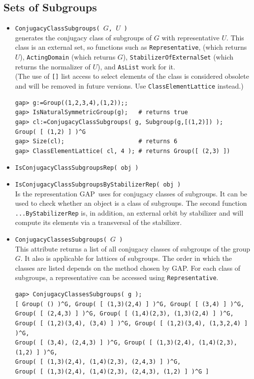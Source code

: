 \documentclass[11pt]{amsart}
\newcommand{\gap}{GAP}   %
\theoremstyle{plain}
\newcommand{\codesize}{\footnotesize}
\newcommand{\<}{\ensuremath{\langle}}
\renewcommand{\>}{\ensuremath{\rangle}}
\begin{document}
\subsection{Sets of Subgroups}
\begin{itemize}
\item {\tt ConjugacyClassSubgroups( $G$, $U$ )}\\
generates the conjugacy class of subgroups of $G$ with representative $U$. This class
is an external set, so functions such as {\tt Representative}, (which returns $U$),
{\tt ActingDomain} (which returns $G$), {\tt StabilizerOfExternalSet} (which returns
the normalizer of $U$), and {\tt AsList} work for it. \\[4pt]
(The use of {\tt []} list access to select elements of the class is considered
obsolete and will be removed in future versions. Use {\tt ClassElementLattice} instead.)
{\codesize
\begin{verbatim}
gap> g:=Group((1,2,3,4),(1,2));;
gap> IsNaturalSymmetricGroup(g);   # returns true
gap> cl:=ConjugacyClassSubgroups( g, Subgroup(g,[(1,2)]) );
Group( [ (1,2) ] )^G
gap> Size(cl);                     # returns 6
gap> ClassElementLattice( cl, 4 ); # returns Group([ (2,3) ])
\end{verbatim}}

\item {\tt IsConjugacyClassSubgroupsRep( obj )}
\item {\tt IsConjugacyClassSubgroupsByStabilizerRep( obj )}\\
Is the representation \gap\ uses for conjugacy classes of subgroups. It can be used to check whether an
object is a class of subgroups. The second function {\tt ...ByStabilizerRep}
is, in addition, an external orbit by stabilizer and will compute its elements via a
transversal of the stabilizer. 

\item {\tt ConjugacyClassesSubgroups( $G$ )}\\
This attribute returns a list of all conjugacy classes of subgroups of the group
$G$. It also is applicable for lattices of subgroups. The order in which the classes
are listed depends on the method chosen by \gap. For each class of subgroups, a
representative can be accessed using {\tt Representative}.%
{\codesize
\begin{verbatim}
gap> ConjugacyClassesSubgroups( g );
[ Group( () )^G, Group( [ (1,3)(2,4) ] )^G, Group( [ (3,4) ] )^G,
Group( [ (2,4,3) ] )^G, Group( [ (1,4)(2,3), (1,3)(2,4) ] )^G,
Group( [ (1,2)(3,4), (3,4) ] )^G, Group( [ (1,2)(3,4), (1,3,2,4) ] )^G,
Group( [ (3,4), (2,4,3) ] )^G, Group( [ (1,3)(2,4), (1,4)(2,3), (1,2) ] )^G,
Group( [ (1,3)(2,4), (1,4)(2,3), (2,4,3) ] )^G,
Group( [ (1,3)(2,4), (1,4)(2,3), (2,4,3), (1,2) ] )^G ]
\end{verbatim}}


\end{itemize}
\end{document}
